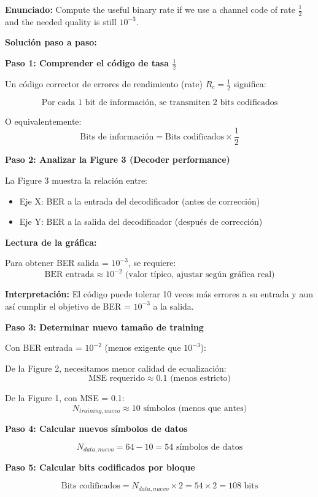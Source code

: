\documentclass[11pt,a4paper]{article}
\begin{document}
\textbf{Enunciado:} Compute the useful binary rate if we use a channel code of rate $\frac{1}{2}$ and the needed quality is still $10^{-3}$.

\vspace{0.3cm}
\textbf{Soluci\'on paso a paso:}

\textbf{Paso 1: Comprender el c\'odigo de tasa $\frac{1}{2}$}

Un c\'odigo corrector de errores de rendimiento (rate) $R_c = \frac{1}{2}$ significa:

\[
\text{Por cada 1 bit de informaci\'on, se transmiten 2 bits codificados}
\]

O equivalentemente:
\[
\text{Bits de informaci\'on} = \text{Bits codificados} \times \frac{1}{2}
\]

\textbf{Paso 2: Analizar la Figure 3 (Decoder performance)}

La Figure 3 muestra la relaci\'on entre:
\begin{itemize}
    \item Eje X: BER a la entrada del decodificador (antes de correcci\'on)
    \item Eje Y: BER a la salida del decodificador (despu\'es de correcci\'on)
\end{itemize}

\textbf{Lectura de la gr\'afica:}

Para obtener BER salida = $10^{-3}$, se requiere:
\[
\text{BER entrada} \approx 10^{-2} \text{ (valor t\'ipico, ajustar seg\'un gr\'afica real)}
\]

\textbf{Interpretaci\'on:} El c\'odigo puede tolerar 10 veces m\'as errores a su entrada y aun as\'i cumplir el objetivo de BER = $10^{-3}$ a la salida.

\textbf{Paso 3: Determinar nuevo tama\~no de training}

Con BER entrada = $10^{-2}$ (menos exigente que $10^{-3}$):

De la Figure 2, necesitamos menor calidad de ecualizaci\'on:
\[
\text{MSE requerido} \approx 0.1 \text{ (menos estricto)}
\]

De la Figure 1, con MSE = 0.1:
\[
N_{training,nuevo} \approx 10 \text{ s\'imbolos (menos que antes)}
\]

\textbf{Paso 4: Calcular nuevos s\'imbolos de datos}

\[
N_{data,nuevo} = 64 - 10 = 54 \text{ s\'imbolos de datos}
\]

\textbf{Paso 5: Calcular bits codificados por bloque}

\[
\text{Bits codificados} = N_{data,nuevo} \times 2 = 54 \times 2 = 108 \text{ bits}
\]
\end{document}
